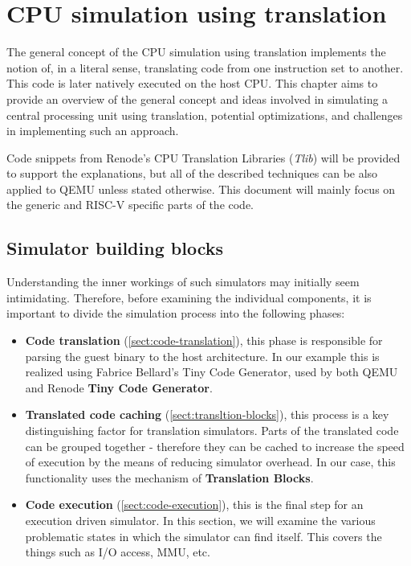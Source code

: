 
\chapter{CPU simulation using translation}
\label{chap:translation}

The general concept of the CPU simulation using translation implements the notion of, in a literal sense, translating
code from one instruction set to another. This code is later natively executed on the host CPU. This chapter aims to
provide an overview of the general concept and ideas involved in simulating a central processing unit using translation,
potential optimizations, and challenges in implementing such an approach.

Code snippets from Renode's CPU Translation Libraries (\textit{Tlib})  will be provided to support the explanations, but
all of the described techniques can be also applied to QEMU unless stated otherwise. This document will mainly focus on
the generic and RISC-V specific parts of the code.

\section*{Simulator building blocks}

Understanding the inner workings of such simulators may initially seem intimidating. Therefore, before examining the
individual components, it is important to divide the simulation process into the following phases:

\begin{itemize}
    \item{\textbf{Code translation} (\ref{sect:code-translation}), this phase is responsible for parsing the guest binary to the host architecture.
    In our example this is realized 
    using Fabrice Bellard's Tiny Code Generator, used by both QEMU and Renode \textbf{Tiny Code Generator}.}
    \item{\textbf{Translated code caching} (\ref{sect:transltion-blocks}), this process is a key distinguishing factor for translation simulators.
    Parts of the translated code can be 
    grouped together -
    therefore they can be cached to increase the speed
    of execution by the means of reducing simulator overhead. In our case, this functionality uses the mechanism of
    \textbf{Translation Blocks}.}
    \item{\textbf{Code execution} (\ref{sect:code-execution}), this is the final step for an execution driven simulator. In this section, we will
    examine the various problematic states in which the simulator can find itself. This covers the things such as
    I/O access, MMU, etc.}
\end{itemize}


